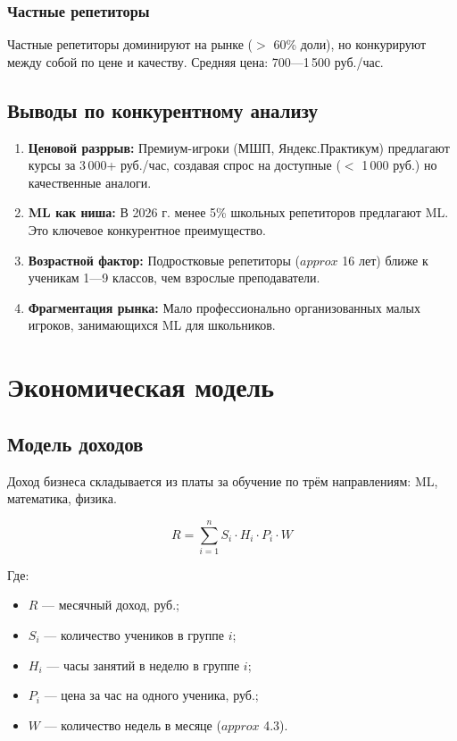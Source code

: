\documentclass[12pt,a4paper]{article}
\begin{document}
\subsubsection{Частные репетиторы}

Частные репетиторы доминируют на рынке (${>}$ 60\% доли), но конкурируют между собой по цене и качеству. Средняя цена: 700---1\,500 руб./час.

\subsection{Выводы по конкурентному анализу}

\begin{enumerate}
  \item \textbf{Ценовой разррыв:} Премиум-игроки (МШП, Яндекс.Практикум) предлагают курсы за 3\,000+ руб./час, создавая спрос на доступные ($<$ 1\,000 руб.) но качественные аналоги.
  \item \textbf{ML как ниша:} В 2026 г. менее 5\% школьных репетиторов предлагают ML. Это ключевое конкурентное преимущество.
  \item \textbf{Возрастной фактор:} Подростковые репетиторы (${approx}$ 16 лет) ближе к ученикам 1---9 классов, чем взрослые преподаватели.
  \item \textbf{Фрагментация рынка:} Мало профессионально организованных малых игроков, занимающихся ML для школьников.
\end{enumerate}

\section{Экономическая модель}

\subsection{Модель доходов}

Доход бизнеса складывается из платы за обучение по трём направлениям: ML, математика, физика.

\begin{equation}
R = \sum_{i=1}^{n} S_i \cdot H_i \cdot P_i \cdot W
\label{eq:revenue}
\end{equation}

Где:
\begin{itemize}
  \item $R$ --- месячный доход, руб.;
  \item $S_i$ --- количество учеников в группе $i$;
  \item $H_i$ --- часы занятий в неделю в группе $i$;
  \item $P_i$ --- цена за час на одного ученика, руб.;
  \item $W$ --- количество недель в месяце (${approx}$ 4.3).
\end{itemize}
\end{document}
